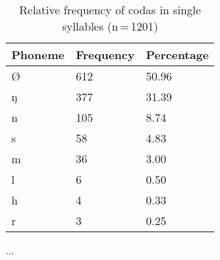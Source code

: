 \begin{table}[hp]\centering
\caption[Relative frequency of codas in single syllables]{Relative frequency of codas in single syllables (n\,=\,1201)}
\begin{tabu} to 0.5\textwidth{X X[c] X[c]}
\tableheaderfont\toprule
Phoneme
	& Frequency
	& Percentage
	\\
	
\toprule

Ø
	& 612
	& 50.96\pct
	\\

\midrule

ŋ
	& 377
	& 31.39\pct
	\\
n
	& 105
	& 8.74\pct
	\\
s
	& 58
	& 4.83\pct
	\\
m
	& 36
	& 3.00\pct
	\\
l
	& 6
	& 0.50\pct
	\\
h
	& 4
	& 0.33\pct
	\\
r
	& 3
	& 0.25\pct
	\\

\bottomrule
\end{tabu}
\label{tab:singcod}
\end{table}

...
